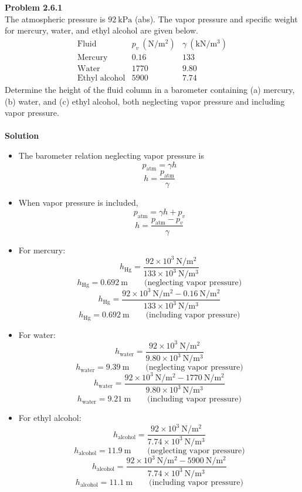 ﻿\documentclass[12pt]{article}
\begin{document}
\section*{}
\textbf{Problem 2.6.1}\\
The atmospheric pressure is $92\ \mathrm{kPa}$ (abs). The vapor pressure and specific weight for mercury, water, and ethyl alcohol are given below.
\[
\begin{array}{c|c|c}
\text{Fluid} & p_v\ (\mathrm{N/m^2}) & \gamma\ (\mathrm{kN/m^3})\\
\hline
\text{Mercury} & 0.16 & 133\\
\text{Water} & 1770 & 9.80\\
\text{Ethyl alcohol} & 5900 & 7.74
\end{array}
\]
Determine the height of the fluid column in a barometer containing (a) mercury, (b) water, and (c) ethyl alcohol, both neglecting vapor pressure and including vapor pressure.\\\\
\textbf{Solution}
\begin{itemize}
\item The barometer relation neglecting vapor pressure is
\[
p_{\mathrm{atm}}=\gamma h
\]
\[
h=\frac{p_{\mathrm{atm}}}{\gamma}
\]
\item When vapor pressure is included,
\[
p_{\mathrm{atm}}=\gamma h+p_v
\]
\[
h=\frac{p_{\mathrm{atm}}-p_v}{\gamma}
\]
\item[(a)] For mercury:
\[
h_{\mathrm{Hg}}=\frac{92\times10^3\ \mathrm{N/m^2}}{133\times10^3\ \mathrm{N/m^3}}
\]
\[
\boxed{h_{\mathrm{Hg}}=0.692\ \mathrm{m}}\qquad\text{(neglecting vapor pressure)}
\]
\[
h_{\mathrm{Hg}}=\frac{92\times10^3\ \mathrm{N/m^2}-0.16\ \mathrm{N/m^2}}{133\times10^3\ \mathrm{N/m^3}}
\]
\[
\boxed{h_{\mathrm{Hg}}=0.692\ \mathrm{m}}\qquad\text{(including vapor pressure)}
\]
\item[(b)] For water:
\[
h_{\mathrm{water}}=\frac{92\times10^3\ \mathrm{N/m^2}}{9.80\times10^3\ \mathrm{N/m^3}}
\]
\[
\boxed{h_{\mathrm{water}}=9.39\ \mathrm{m}}\qquad\text{(neglecting vapor pressure)}
\]
\[
h_{\mathrm{water}}=\frac{92\times10^3\ \mathrm{N/m^2}-1770\ \mathrm{N/m^2}}{9.80\times10^3\ \mathrm{N/m^3}}
\]
\[
\boxed{h_{\mathrm{water}}=9.21\ \mathrm{m}}\qquad\text{(including vapor pressure)}
\]
\item[(c)] For ethyl alcohol:
\[
h_{\mathrm{alcohol}}=\frac{92\times10^3\ \mathrm{N/m^2}}{7.74\times10^3\ \mathrm{N/m^3}}
\]
\[
\boxed{h_{\mathrm{alcohol}}=11.9\ \mathrm{m}}\qquad\text{(neglecting vapor pressure)}
\]
\[
h_{\mathrm{alcohol}}=\frac{92\times10^3\ \mathrm{N/m^2}-5900\ \mathrm{N/m^2}}{7.74\times10^3\ \mathrm{N/m^3}}
\]
\[
\boxed{h_{\mathrm{alcohol}}=11.1\ \mathrm{m}}\qquad\text{(including vapor pressure)}
\]
\end{itemize}
\end{document}
